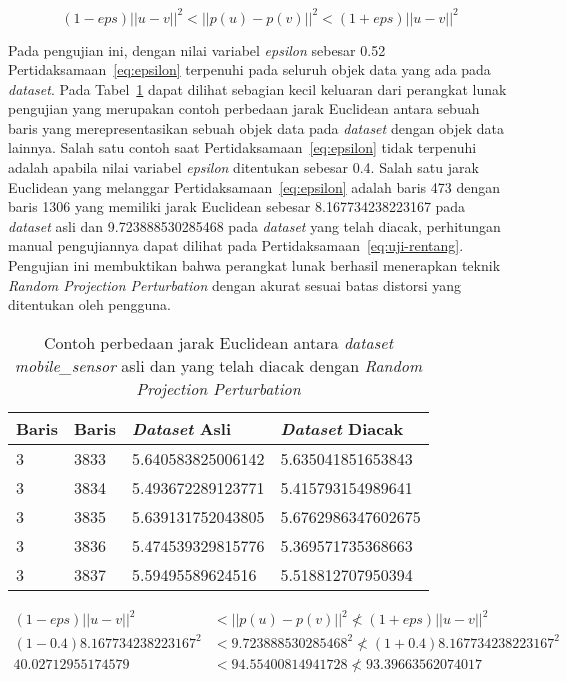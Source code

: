 \begin{equation}\label{eq:epsilon}
	(1-eps)||u - v||^{2}<||p(u) - p(v)||^{2}<(1+eps)||u - v||^{2}
\end{equation}

Pada pengujian ini, dengan nilai variabel \textit{epsilon} sebesar 0.52 Pertidaksamaan~\ref{eq:epsilon} terpenuhi pada seluruh objek data yang ada pada \textit{dataset}. Pada Tabel~\ref{table:uji-projection} dapat dilihat sebagian kecil keluaran dari perangkat lunak pengujian yang merupakan contoh perbedaan jarak Euclidean antara sebuah baris yang merepresentasikan sebuah objek data pada \textit{dataset} dengan objek data lainnya. Salah satu contoh saat Pertidaksamaan~\ref{eq:epsilon} tidak terpenuhi adalah apabila nilai variabel \textit{epsilon} ditentukan sebesar 0.4. Salah satu jarak Euclidean yang melanggar Pertidaksamaan~\ref{eq:epsilon} adalah baris 473 dengan baris 1306 yang memiliki jarak Euclidean sebesar 8.167734238223167 pada \textit{dataset} asli dan 9.723888530285468 pada \textit{dataset} yang telah diacak, perhitungan manual pengujiannya dapat dilihat pada Pertidaksamaan~\ref{eq:uji-rentang}. Pengujian ini membuktikan bahwa perangkat lunak berhasil menerapkan teknik \textit{Random Projection Perturbation} dengan akurat sesuai batas distorsi yang ditentukan oleh pengguna.

\begin{table}
	\centering
	\caption{Contoh perbedaan jarak Euclidean antara \textit{dataset mobile\_sensor} asli dan yang telah diacak dengan \textit{Random Projection Perturbation}}
	\begin{tabular}{ll|ll}
		\hline
		\textbf{Baris}&\textbf{Baris}&\textbf{\textit{Dataset} Asli}&\textbf{\textit{Dataset} Diacak}\\ \hline
		3&3833&5.640583825006142&5.635041851653843\\
		3&3834&5.493672289123771&5.415793154989641\\
		3&3835&5.639131752043805&5.6762986347602675\\
		3&3836&5.474539329815776&5.369571735368663\\
		3&3837&5.59495589624516&5.518812707950394\\
		\hline
	\end{tabular}
	\label{table:uji-projection}
\end{table}

\begin{align}
	(1-eps)||u - v||^{2}&<||p(u) - p(v)||^{2}\nless(1+eps)||u - v||^{2} \label{eq:uji-rentang}\\
	(1-0.4)8.167734238223167^{2}&<9.723888530285468^{2}\nless(1+0.4)8.167734238223167^{2} \nonumber\\
	40.02712955174579 &< 94.55400814941728 \nless 93.39663562074017 \nonumber
\end{align}

